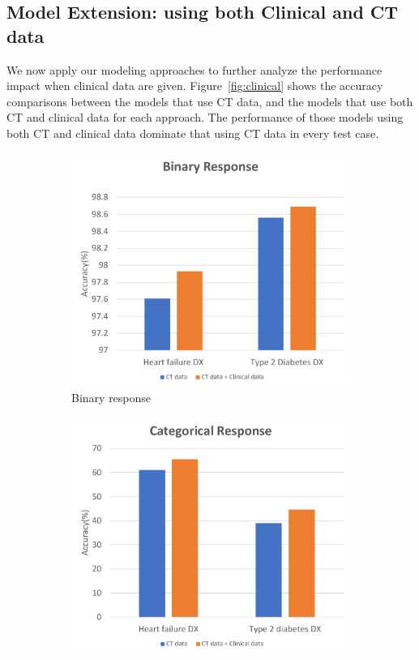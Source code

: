 \subsection{Model Extension: using both Clinical and CT data}
\label{sec:clinical_CT}

We now apply our modeling approaches to further analyze the performance impact when clinical data are given.
Figure~\ref{fig:clinical} shows the accuracy comparisons between the models that use CT data, and the models that use both CT and clinical data for each approach.
The performance of those models using both CT and clinical data dominate that using CT data in every test case.

\begin{figure}[!h]
    \centering
    \begin{subfigure}{.48\textwidth}
        \centering
        \includegraphics[width=.9\textwidth]{figures/binary_graph.pdf}
        \caption{Binary response}
        \label{fig:binary_outcome}
    \end{subfigure}
    \begin{subfigure}{.48\textwidth}
        \centering
        \includegraphics[width=.9\textwidth]{figures/categorical_graph.pdf}

\end{subfigure}
\end{figure}
